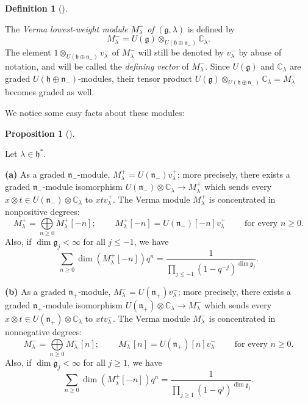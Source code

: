 \documentclass
[numbers=enddot,12pt,final,onecolumn,german,notitlepage]{scrartcl}%
\theoremstyle{definition}
\newtheorem{prop}[theo]{Proposition}
\newenvironment{proposition}[1][]
{\begin{prop}[#1]\begin{leftbar}}
{\end{leftbar}\end{prop}}
\newtheorem{defi}[theo]{Definition}
\newenvironment{definition}[1][]
{\begin{defi}[#1]\begin{leftbar}}
{\end{leftbar}\end{defi}}
\begin{document}
\begin{definition}
The \textit{Verma lowest-weight module }$M_{\lambda}^{-}$ \textit{of }$\left(
\mathfrak{g},\lambda\right)  $ is defined by%
\[
M_{\lambda}^{-}=U\left(  \mathfrak{g}\right)  \otimes_{U\left(  \mathfrak{h}%
\oplus\mathfrak{n}_{-}\right)  }\mathbb{C}_{\lambda}.
\]
The element $1\otimes_{U\left(  \mathfrak{h}\oplus\mathfrak{n}_{-}\right)
}v_{\lambda}^{-}$ of $M_{\lambda}^{-}$ will still be denoted by $v_{\lambda
}^{-}$ by abuse of notation, and will be called the \textit{defining vector}
of $M_{\lambda}^{-}$. Since $U\left(  \mathfrak{g}\right)  $ and
$\mathbb{C}_{\lambda}$ are graded $U\left(  \mathfrak{h}\oplus\mathfrak{n}%
_{-}\right)  $-modules, their tensor product $U\left(  \mathfrak{g}\right)
\otimes_{U\left(  \mathfrak{h}\oplus\mathfrak{n}_{-}\right)  }\mathbb{C}%
_{\lambda}=M_{\lambda}^{-}$ becomes graded as well.
\end{definition}

We notice some easy facts about these modules:

\begin{proposition}
\label{prop.verma1}Let $\lambda\in\mathfrak{h}^{\ast}$.

\textbf{(a)} As a graded $\mathfrak{n}_{-}$-module, $M_{\lambda}^{+}=U\left(
\mathfrak{n}_{-}\right)  v_{\lambda}^{+}$; more precisely, there exists a
graded $\mathfrak{n}_{-}$-module isomorphism $U\left(  \mathfrak{n}%
_{-}\right)  \otimes\mathbb{C}_{\lambda}\rightarrow M_{\lambda}^{+}$ which
sends every $x\otimes t\in U\left(  \mathfrak{n}_{-}\right)  \otimes
\mathbb{C}_{\lambda}$ to $xtv_{\lambda}^{+}$. The Verma module $M_{\lambda
}^{+}$ is concentrated in nonpositive degrees:%
\[
M_{\lambda}^{+}=\bigoplus\limits_{n\geq0}M_{\lambda}^{+}\left[  -n\right]
;\ \ \ \ \ \ \ \ \ \ M_{\lambda}^{+}\left[  -n\right]  =U\left(
\mathfrak{n}_{-}\right)  \left[  -n\right]  v_{\lambda}^{+}%
\ \ \ \ \ \ \ \ \ \ \text{for every }n\geq0.
\]
Also, if $\dim\mathfrak{g}_{j}<\infty$ for all $j\leq-1$, we have%
\[
\sum\limits_{n\geq0}\dim\left(  M_{\lambda}^{+}\left[  -n\right]  \right)
q^{n}=\dfrac{1}{\prod\limits_{j\leq-1}\left(  1-q^{-j}\right)  ^{\dim
\mathfrak{g}_{j}}}.
\]


\textbf{(b)} As a graded $\mathfrak{n}_{+}$-module, $M_{\lambda}^{-}=U\left(
\mathfrak{n}_{+}\right)  v_{\lambda}^{-}$; more precisely, there exists a
graded $\mathfrak{n}_{+}$-module isomorphism $U\left(  \mathfrak{n}%
_{+}\right)  \otimes\mathbb{C}_{\lambda}\rightarrow M_{\lambda}^{-}$ which
sends every $x\otimes t\in U\left(  \mathfrak{n}_{+}\right)  \otimes
\mathbb{C}_{\lambda}$ to $xtv_{\lambda}^{-}$. The Verma module $M_{\lambda
}^{-}$ is concentrated in nonnegative degrees:%
\[
M_{\lambda}^{-}=\bigoplus\limits_{n\geq0}M_{\lambda}^{-}\left[  n\right]
;\ \ \ \ \ \ \ \ \ \ M_{\lambda}^{-}\left[  n\right]  =U\left(  \mathfrak{n}%
_{+}\right)  \left[  n\right]  v_{\lambda}^{-}\ \ \ \ \ \ \ \ \ \ \text{for
every }n\geq0.
\]
Also, if $\dim\mathfrak{g}_{j}<\infty$ for all $j\geq1$, we have%
\[
\sum\limits_{n\geq0}\dim\left(  M_{\lambda}^{+}\left[  -n\right]  \right)
q^{n}=\dfrac{1}{\prod\limits_{j\geq1}\left(  1-q^{j}\right)  ^{\dim
\mathfrak{g}_{j}}}.
\]

\end{proposition}
\end{document}
